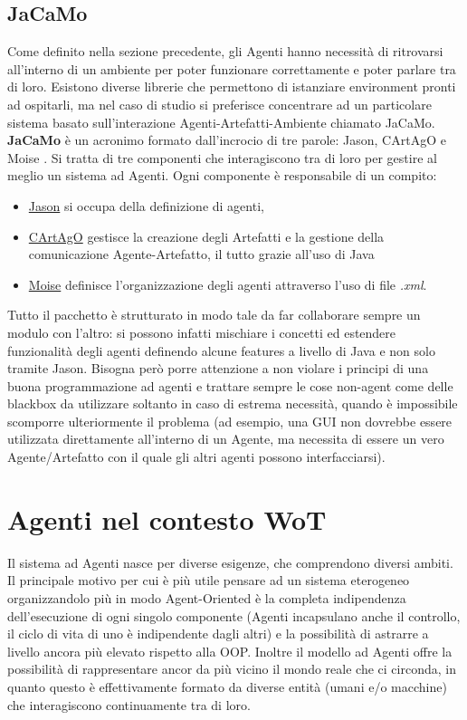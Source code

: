 \documentclass[12pt,a4paper,openright,oneside]{report}
\begin{document}
\subsection{JaCaMo}
Come definito nella sezione precedente, gli Agenti hanno necessità di ritrovarsi all'interno di un ambiente per poter funzionare correttamente e poter parlare tra di loro. Esistono diverse librerie che permettono di istanziare environment pronti ad ospitarli, ma nel caso di studio si preferisce concentrare ad un particolare sistema basato sull'interazione Agenti-Artefatti-Ambiente chiamato JaCaMo.\\

\textbf{JaCaMo} \cite{jacamo} è un acronimo formato dall'incrocio di tre parole: Jason, CArtAgO \cite{cartago} e Moise \cite{moise}. Si tratta di tre componenti che interagiscono tra di loro per gestire al meglio un sistema ad Agenti. Ogni componente è responsabile di un compito:

\begin{itemize}
	\item \ul{Jason} si occupa della definizione di agenti,
	\item \ul{CArtAgO} gestisce la creazione degli Artefatti e la gestione della comunicazione Agente-Artefatto, il tutto grazie all'uso di Java
	\item \ul{Moise} definisce l'organizzazione degli agenti attraverso l'uso di file \textit{.xml}.
\end{itemize}

Tutto il pacchetto è strutturato in modo tale da far collaborare sempre un modulo con l'altro: si possono infatti mischiare i concetti ed estendere funzionalità degli agenti definendo alcune features a livello di Java e non solo tramite Jason. Bisogna però porre attenzione a non violare i principi di una buona programmazione ad agenti e trattare sempre le cose non-agent come delle blackbox da utilizzare soltanto in caso di estrema necessità, quando è impossibile scomporre ulteriormente il problema (ad esempio, una GUI non dovrebbe essere utilizzata direttamente all'interno di un Agente, ma necessita di essere un vero Agente/Artefatto con il quale gli altri agenti possono interfacciarsi).

\section{Agenti nel contesto WoT}

Il sistema ad Agenti nasce per diverse esigenze, che comprendono diversi ambiti. Il principale motivo per cui è più utile pensare ad un sistema eterogeneo organizzandolo più in modo Agent-Oriented è la completa indipendenza dell'esecuzione di ogni singolo componente (Agenti incapsulano anche il controllo, il ciclo di vita di uno è indipendente dagli altri) e la possibilità di astrarre a livello ancora più elevato rispetto alla OOP. Inoltre il modello ad Agenti offre la possibilità di rappresentare ancor da più vicino il mondo reale che ci circonda, in quanto questo è effettivamente formato da diverse entità (umani e/o macchine) che interagiscono continuamente tra di loro.\\
\end{document}
